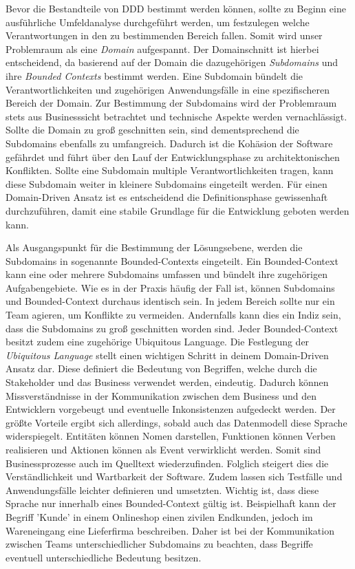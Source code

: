 Bevor die Bestandteile von DDD bestimmt werden können, sollte zu Beginn eine ausführliche Umfeldanalyse durchgeführt werden, um festzulegen welche Verantwortungen in den zu bestimmenden Bereich fallen. Somit wird unser Problemraum als eine \emph{Domain} aufgespannt. Der Domainschnitt ist hierbei entscheidend, da basierend auf der Domain die dazugehörigen \emph{Subdomains} und ihre \emph{Bounded Contexts} bestimmt werden. Eine Subdomain bündelt die Verantwortlichkeiten und zugehörigen Anwendungsfälle in eine spezifischeren Bereich der Domain. Zur Bestimmung der Subdomains wird der Problemraum stets aus Businesssicht betrachtet und technische Aspekte werden vernachlässigt. Sollte die Domain zu groß geschnitten sein, sind dementsprechend die Subdomains ebenfalls zu umfangreich. Dadurch ist die Kohäsion der Software gefährdet und führt über den Lauf der Entwicklungsphase zu architektonischen Konflikten. Sollte eine Subdomain multiple Verantwortlichkeiten tragen, kann diese Subdomain weiter in kleinere Subdomains eingeteilt werden. Für einen Domain-Driven Ansatz ist es entscheidend die Definitionsphase gewissenhaft durchzuführen, damit eine stabile Grundlage für die Entwicklung geboten werden kann. 

Als Ausgangspunkt für die Bestimmung der Lösungsebene, werden die Subdomains in sogenannte Bounded-Contexts eingeteilt. Ein Bounded-Context kann eine oder mehrere Subdomains umfassen und bündelt ihre zugehörigen Aufgabengebiete. Wie es in der Praxis häufig der Fall ist, können Subdomains und Bounded-Context durchaus identisch sein. In jedem Bereich sollte nur ein Team agieren, um Konflikte zu vermeiden. Andernfalls kann dies ein Indiz sein, dass die Subdomains zu groß geschnitten worden sind. Jeder Bounded-Context besitzt zudem eine zugehörige Ubiquitous Language. Die Festlegung der \emph{Ubiquitous Language} stellt einen wichtigen Schritt in deinem Domain-Driven Ansatz dar. Diese definiert die Bedeutung von Begriffen, welche durch die Stakeholder und das Business verwendet werden, eindeutig. Dadurch können Missverständnisse in der Kommunikation zwischen dem Business und den Entwicklern vorgebeugt und eventuelle Inkonsistenzen aufgedeckt werden. Der größte Vorteile ergibt sich allerdings, sobald auch das Datenmodell diese Sprache widerspiegelt. Entitäten können Nomen darstellen, Funktionen können Verben realisieren und Aktionen können als Event verwirklicht werden. Somit sind Businessprozesse auch im Quelltext wiederzufinden. Folglich steigert dies die Verständlichkeit und Wartbarkeit der Software. Zudem lassen sich Testfälle und Anwendungsfälle leichter definieren und umsetzten. Wichtig ist, dass diese Sprache nur innerhalb eines Bounded-Context gültig ist. Beispielhaft kann der Begriff 'Kunde' in einem Onlineshop einen zivilen Endkunden, jedoch im Wareneingang eine Lieferfirma beschreiben. Daher ist bei der Kommunikation zwischen Teams unterschiedlicher Subdomains zu beachten, dass Begriffe eventuell unterschiedliche Bedeutung besitzen. 

